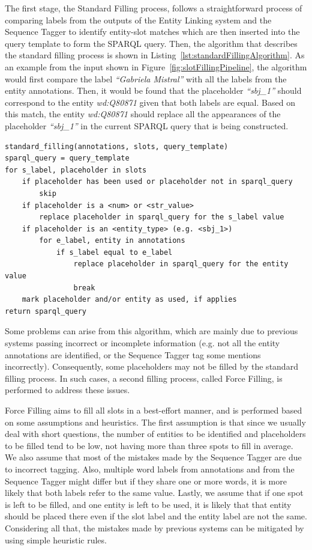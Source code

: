 The first stage, the Standard Filling process, follows a straightforward process of comparing 
labels from the outputs of the Entity Linking system and the Sequence Tagger to identify 
entity-slot matches which are then inserted into the query template to form the SPARQL query. 
Then, the algorithm that describes the standard filling process is shown in 
Listing~\ref{lst:standardFillingAlgorithm}. As an example from the input shown in 
Figure~\ref{fig:slotFillingPipeline}, the algorithm would first compare the label 
\textit{“Gabriela Mistral”} with all the labels from the entity annotations. Then, it would 
be found that the placeholder \textit{“sbj\_1”} should correspond to the entity 
\textit{wd:Q80871} given that both labels are equal. Based on this match, the entity 
\textit{wd:Q80871} should replace all the appearances of the placeholder \textit{“sbj\_1”} in 
the current SPARQL query that is being constructed.

\begin{lstlisting}[captionpos=b, 
    caption=Standard Filling algorithm., 
    label=lst:standardFillingAlgorithm,
    basicstyle=\ttfamily,frame=single]
standard_filling(annotations, slots, query_template)
sparql_query = query_template
for s_label, placeholder in slots
    if placeholder has been used or placeholder not in sparql_query
        skip
    if placeholder is a <num> or <str_value>
        replace placeholder in sparql_query for the s_label value
    if placeholder is an <entity_type> (e.g. <sbj_1>)
        for e_label, entity in annotations
            if s_label equal to e_label
                replace placeholder in sparql_query for the entity value
                break
    mark placeholder and/or entity as used, if applies
return sparql_query
\end{lstlisting}

Some problems can arise from this algorithm, which are mainly due to previous systems passing 
incorrect or incomplete information (e.g. not all the entity annotations are identified, or 
the Sequence Tagger tag some mentions incorrectly). Consequently, some placeholders may not 
be filled by the standard filling process. In such cases, a second filling process, called 
Force Filling, is performed to address these issues.

Force Filling aims to fill all slots in a best-effort manner, and is performed based on some 
assumptions and heuristics. The first assumption is that since we usually deal with short 
questions, the number of entities to be identified and placeholders to be filled tend to be 
low, not having more than three spots to fill in average. We also assume that most of the 
mistakes made by the Sequence Tagger are due to incorrect tagging. Also, multiple word labels 
from annotations and from the Sequence Tagger might differ but if they share one or more 
words, it is more likely that both labels refer to the same value. Lastly, we assume that if 
one spot is left to be filled, and one entity is left to be used, it is likely that that 
entity should be placed there even if the slot label and the entity label are not the same. 
Considering all that, the mistakes made by previous systems can be mitigated by using simple 
heuristic rules. 

